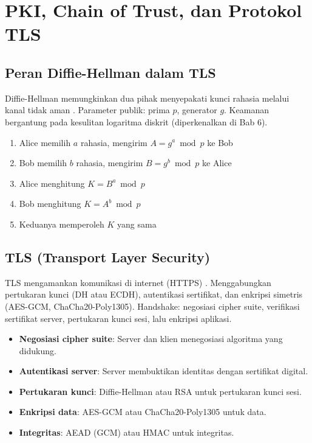 ﻿\section{PKI, Chain of Trust, dan Protokol TLS}

\subsection{Peran Diffie-Hellman dalam TLS}

Diffie-Hellman memungkinkan dua pihak menyepakati kunci rahasia melalui kanal tidak aman \cite{stallings2017}. Parameter publik: prima $p$, generator $g$. Keamanan bergantung pada kesulitan logaritma diskrit (diperkenalkan di Bab 6).

\begin{enumerate}
  \item Alice memilih $a$ rahasia, mengirim $A = g^a \bmod p$ ke Bob
  \item Bob memilih $b$ rahasia, mengirim $B = g^b \bmod p$ ke Alice
  \item Alice menghitung $K = B^a \bmod p$
  \item Bob menghitung $K = A^b \bmod p$
  \item Keduanya memperoleh $K$ yang sama
\end{enumerate}

\subsection{TLS (Transport Layer Security)}

TLS mengamankan komunikasi di internet (HTTPS) \cite{stallings2017}. Menggabungkan pertukaran kunci (DH atau ECDH), autentikasi sertifikat, dan enkripsi simetris (AES-GCM, ChaCha20-Poly1305). Handshake: negosiasi cipher suite, verifikasi sertifikat server, pertukaran kunci sesi, lalu enkripsi aplikasi.

\begin{itemize}
  \item \textbf{Negosiasi cipher suite}: Server dan klien menegosiasi algoritma yang didukung.
  \item \textbf{Autentikasi server}: Server membuktikan identitas dengan sertifikat digital.
  \item \textbf{Pertukaran kunci}: Diffie-Hellman atau RSA untuk pertukaran kunci sesi.
  \item \textbf{Enkripsi data}: AES-GCM atau ChaCha20-Poly1305 untuk data.
  \item \textbf{Integritas}: AEAD (GCM) atau HMAC untuk integritas.
\end{itemize}

